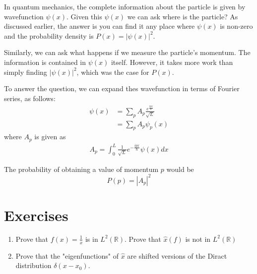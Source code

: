 \documentclass[book.tex]{subfiles}
\begin{document}
In quantum mechanics, the complete information about the particle is given by wavefunction $\psi(x)$. Given this $\psi(x)$ we can ask where is the particle? As discussed earlier, the answer is you can find it any place where $\psi(x)$ is non-zero and the  probability density is $P(x)=|\psi(x)|^2$.

Similarly, we can ask what happens if we measure the particle's momentum. The information is contained in $\psi(x)$ itself. However, it takes more work than simply
finding $|\psi(x)|^2$, which was the case for $P(x)$. 

To answer the question, we can expand thes wavefunction in terms of Fourier series, as follows:
\begin{align}
\psi(x) &= \sum_{p} A_p \frac{e^{\frac{ipx}{\hslash}}}{\sqrt{L}}\\
&=\sum_{p}A_p\psi_p(x)\end{align}
where $A_p$ is given as 
\begin{align}
A_p=\int_{0}^{L}\frac{1}{\sqrt{L}}e^{-\frac{ipx}{\hslash}}\psi(x) dx
\end{align}

The probability of obtaining a value of momentum $p$ would be $$P(p)=|A_p|^2$$


\section{Exercises}

\begin{enumerate}
    \item Prove that $f(x) = \frac{1}{x}$ is in $L^2(\mathbb{R})$. Prove that $\hat{x}(f)$ is not in $L^2(\mathbb{R})$
    \item Prove that the "eigenfunctions" of $\hat{x}$ are shifted versions of the Diract distribution $\delta(x-x_0)$.
\end{enumerate}
\end{document}
